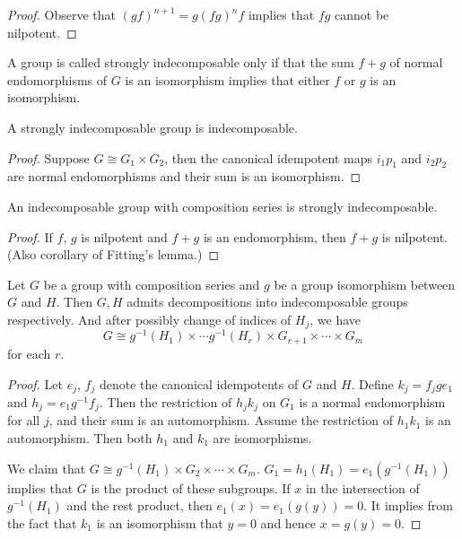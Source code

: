 \begin{proof}
  Observe that $(gf)^{n+1}=g(fg)^{n}f$ implies that $fg$ cannot be nilpotent.
\end{proof}

\begin{definition}
  A group is called strongly indecomposable only if that the sum $f+g$ of normal endomorphisms of $G$ is an isomorphism implies that either $f$ or $g$ is an isomorphism.
\end{definition}

\begin{proposition}
  A strongly indecomposable group is indecomposable.
\end{proposition}

\begin{proof}
  Suppose $G\cong G_1\times G_2$, then the canonical idempotent maps $i_1p_1$ and $i_2p_2$ are normal endomorphisms and their sum is an isomorphism.
\end{proof}

\begin{proposition}
  An indecomposable group with composition series is strongly indecomposable.
\end{proposition}

\begin{proof}
  If $f$, $g$ is nilpotent and $f+g$ is an endomorphism, then $f+g$ is nilpotent. (Also corollary of Fitting's lemma.)
\end{proof}

\begin{theorem}
  Let $G$ be a group with composition series and $g$ be a group isomorphism between $G$ and $H$. Then $G, H$ admits decompositions into indecomposable groups respectively. And after possibly change of indices of $H_j$, we have \begin{equation}
    G\cong g^{-1}(H_1)\times \dotsb g^{-1}(H_r) \times G_{r+1}\times \dotsb \times G_m
  \end{equation}
  for each $r$.
\end{theorem}

\begin{proof}
  Let $e_j$, $f_j$ denote the canonical idempotents of $G$ and $H$. Define $k_j=f_jge_1$ and $h_j=e_1g^{-1}f_j$. Then the restriction of $h_jk_j$ on $G_1$ is a normal endomorphism for all $j$, and their sum is an automorphism. Assume the restriction of $h_1k_1$ is an automorphism. Then both $h_1$ and $k_1$ are isomorphisms.

  We claim that $G\cong g^{-1}(H_1)\times G_2\times \dotsb\times G_m$. $G_1 = h_1(H_1)=e_1(g^{-1}(H_1))$ implies that $G$ is the product of these subgroups. If $x$ in the intersection of $g^{-1}(H_1)$ and the rest product, then $e_1(x)=e_1(g(y))=0$. It implies from the fact that $k_1$ is an isomorphism that $y=0$ and hence $x=g(y)=0$.
\end{proof}
